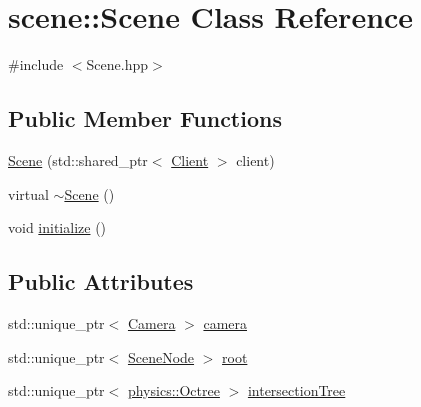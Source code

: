 \hypertarget{classscene_1_1Scene}{\section{scene\-:\-:Scene Class Reference}
\label{classscene_1_1Scene}
}


{\ttfamily \#include $<$Scene.\-hpp$>$}

\subsection*{Public Member Functions}
\begin{DoxyCompactItemize}
\item 
\hyperlink{classscene_1_1Scene_a9351c9df6e8cb4e6b3e13f4037511a9c}{Scene} (std\-::shared\-\_\-ptr$<$ \hyperlink{classClient}{Client} $>$ client)
\item 
virtual \hyperlink{classscene_1_1Scene_a70e7fe6fb3e73a6f484cbe00fef9c4e1}{$\sim$\-Scene} ()
\item 
void \hyperlink{classscene_1_1Scene_ac5f4f160c0b68c8aaef2fa18b7cce19f}{initialize} ()
\end{DoxyCompactItemize}
\subsection*{Public Attributes}
\begin{DoxyCompactItemize}
\item 
std\-::unique\-\_\-ptr$<$ \hyperlink{classscene_1_1Camera}{Camera} $>$ \hyperlink{classscene_1_1Scene_a6e76d3ce0d9372b30ea7798ace438f41}{camera}
\item 
std\-::unique\-\_\-ptr$<$ \hyperlink{classscene_1_1SceneNode}{Scene\-Node} $>$ \hyperlink{classscene_1_1Scene_ad64e692101bece140472f85bd7da19b8}{root}
\item 
std\-::unique\-\_\-ptr$<$ \hyperlink{namespacephysics_a8031fb56deaac8c62e513678eb1ec44f}{physics\-::\-Octree} $>$ \hyperlink{classscene_1_1Scene_a777f60164480fc00fa3931a8b08495a5}{intersection\-Tree}
\end{DoxyCompactItemize}


